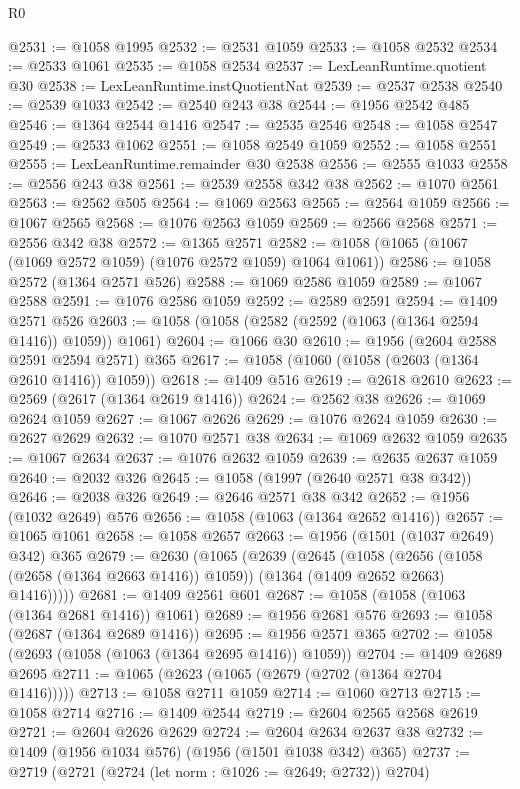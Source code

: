 \begin{lexlean}{R0}
\begin{coremodule}
@2531 := @1058 @1995
@2532 := @2531 @1059
@2533 := @1058 @2532
@2534 := @2533 @1061
@2535 := @1058 @2534
@2537 := LexLeanRuntime.quotient @30
@2538 := LexLeanRuntime.instQuotientNat
@2539 := @2537 @2538
@2540 := @2539 @1033
@2542 := @2540 @243 @38
@2544 := @1956 @2542 @485
@2546 := @1364 @2544 @1416
@2547 := @2535 @2546
@2548 := @1058 @2547
@2549 := @2533 @1062
@2551 := @1058 @2549 @1059
@2552 := @1058 @2551
@2555 := LexLeanRuntime.remainder @30 @2538
@2556 := @2555 @1033
@2558 := @2556 @243 @38
@2561 := @2539 @2558 @342 @38
@2562 := @1070 @2561
@2563 := @2562 @505
@2564 := @1069 @2563
@2565 := @2564 @1059
@2566 := @1067 @2565
@2568 := @1076 @2563 @1059
@2569 := @2566 @2568
@2571 := @2556 @342 @38
@2572 := @1365 @2571
@2582 := @1058 (@1065 (@1067 (@1069 @2572 @1059) (@1076 @2572 @1059) @1064 @1061))
@2586 := @1058 @2572 (@1364 @2571 @526)
@2588 := @1069 @2586 @1059
@2589 := @1067 @2588
@2591 := @1076 @2586 @1059
@2592 := @2589 @2591
@2594 := @1409 @2571 @526
@2603 := @1058 (@1058 (@2582 (@2592 (@1063 (@1364 @2594 @1416)) @1059)) @1061)
@2604 := @1066 @30
@2610 := @1956 (@2604 @2588 @2591 @2594 @2571) @365
@2617 := @1058 (@1060 (@1058 (@2603 (@1364 @2610 @1416)) @1059))
@2618 := @1409 @516
@2619 := @2618 @2610
@2623 := @2569 (@2617 (@1364 @2619 @1416))
@2624 := @2562 @38
@2626 := @1069 @2624 @1059
@2627 := @1067 @2626
@2629 := @1076 @2624 @1059
@2630 := @2627 @2629
@2632 := @1070 @2571 @38
@2634 := @1069 @2632 @1059
@2635 := @1067 @2634
@2637 := @1076 @2632 @1059
@2639 := @2635 @2637 @1059
@2640 := @2032 @326
@2645 := @1058 (@1997 (@2640 @2571 @38 @342))
@2646 := @2038 @326
@2649 := @2646 @2571 @38 @342
@2652 := @1956 (@1032 @2649) @576
@2656 := @1058 (@1063 (@1364 @2652 @1416))
@2657 := @1065 @1061
@2658 := @1058 @2657
@2663 := @1956 (@1501 (@1037 @2649) @342) @365
@2679 := @2630
    (@1065
      (@2639
        (@2645
          (@1058
            (@2656 (@1058 (@2658 (@1364 @2663 @1416)) @1059))
            (@1364 (@1409 @2652 @2663) @1416)))))
@2681 := @1409 @2561 @601
@2687 := @1058 (@1058 (@1063 (@1364 @2681 @1416)) @1061)
@2689 := @1956 @2681 @576
@2693 := @1058 (@2687 (@1364 @2689 @1416))
@2695 := @1956 @2571 @365
@2702 := @1058 (@2693 (@1058 (@1063 (@1364 @2695 @1416)) @1059))
@2704 := @1409 @2689 @2695
@2711 := @1065 (@2623 (@1065 (@2679 (@2702 (@1364 @2704 @1416)))))
@2713 := @1058 @2711 @1059
@2714 := @1060 @2713
@2715 := @1058 @2714
@2716 := @1409 @2544
@2719 := @2604 @2565 @2568 @2619
@2721 := @2604 @2626 @2629
@2724 := @2604 @2634 @2637 @38
@2732 := @1409 (@1956 @1034 @576) (@1956 (@1501 @1038 @342) @365)
@2737 := @2719 (@2721 (@2724 (let norm : @1026 := @2649; @2732)) @2704)

\end{coremodule}
\end{lexlean}
